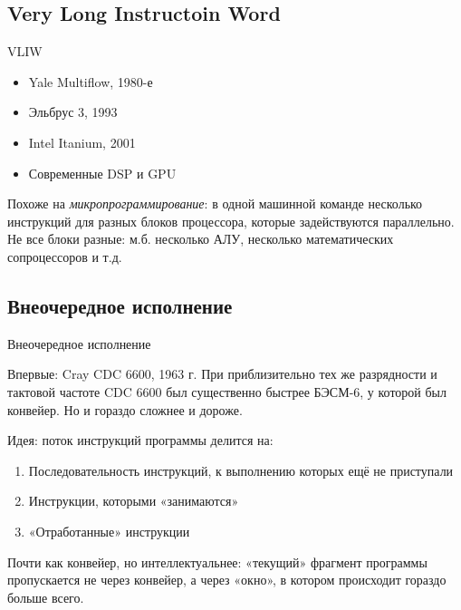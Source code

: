 \documentclass[xetex,aspectratio=43]{beamer}
\begin{document}
\subsection{Very Long Instructoin Word}

\begin{frame}{VLIW}

    \begin{itemize}
        \item Yale Multiflow, 1980-е
        \item Эльбрус 3, 1993
        \item Intel Itanium, 2001
        \item Современные DSP и GPU
    \end{itemize}

    Похоже на \emph{микропрограммирование}: в одной машинной команде несколько инструкций для разных блоков процессора, которые задействуются параллельно. Не все блоки разные: м.б. несколько АЛУ, несколько математических сопроцессоров и т.д.
\end{frame}

\subsection{Внеочередное исполнение}

\begin{frame}{Внеочередное исполнение}

    Впервые: Cray CDC 6600, 1963 г. При приблизительно тех же разрядности и
    тактовой частоте CDC 6600 был существенно быстрее БЭСМ-6, у которой был
    конвейер. Но и гораздо сложнее и дороже.

    Идея: поток инструкций программы делится на:

    \begin{enumerate}
        \tightlist
        \item
        Последовательность инструкций, к выполнению которых ещё не приступали
        \item
        Инструкции, которыми «занимаются»
        \item
        «Отработанные» инструкции
    \end{enumerate}

    \pause

    Почти как конвейер, но интеллектуальнее: «текущий» фрагмент программы
    пропускается не через конвейер, а через «окно», в котором происходит
    гораздо больше всего.
\end{frame}
\end{document}
